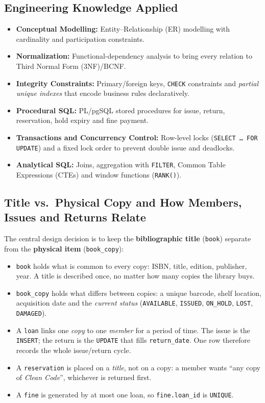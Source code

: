 \documentclass[11pt,a4paper]{report}
\begin{document}
\subsection{Engineering Knowledge Applied}
\begin{itemize}
    \item \textbf{Conceptual Modelling:} Entity--Relationship (ER) modelling with cardinality and participation constraints.
    \item \textbf{Normalization:} Functional-dependency analysis to bring every relation to Third Normal Form (3NF)/BCNF.
    \item \textbf{Integrity Constraints:} Primary/foreign keys, \texttt{CHECK} constraints and \emph{partial unique indexes} that encode business rules declaratively.
    \item \textbf{Procedural SQL:} PL/pgSQL stored procedures for issue, return, reservation, hold expiry and fine payment.
    \item \textbf{Transactions and Concurrency Control:} Row-level locks (\texttt{SELECT \dots\ FOR UPDATE}) and a fixed lock order to prevent double issue and deadlocks.
    \item \textbf{Analytical SQL:} Joins, aggregation with \texttt{FILTER}, Common Table Expressions (CTEs) and window functions (\texttt{RANK()}).
\end{itemize}

\subsection{Title vs.\ Physical Copy and How Members, Issues and Returns Relate}
\label{sec:er}
The central design decision is to keep the \textbf{bibliographic title} (\texttt{book}) separate from the \textbf{physical item} (\texttt{book\_copy}):
\begin{itemize}
    \item \texttt{book} holds what is common to every copy: ISBN, title, edition, publisher, year. A title is described once, no matter how many copies the library buys.
    \item \texttt{book\_copy} holds what differs between copies: a unique barcode, shelf location, acquisition date and the \emph{current status} (\texttt{AVAILABLE}, \texttt{ISSUED}, \texttt{ON\_HOLD}, \texttt{LOST}, \texttt{DAMAGED}).
    \item A \texttt{loan} links one \emph{copy} to one \emph{member} for a period of time. The issue is the \texttt{INSERT}; the return is the \texttt{UPDATE} that fills \texttt{return\_date}. One row therefore records the whole issue/return cycle.
    \item A \texttt{reservation} is placed on a \emph{title}, not on a copy: a member wants ``any copy of \textit{Clean Code}'', whichever is returned first.
    \item A \texttt{fine} is generated by at most one loan, so \texttt{fine.loan\_id} is \texttt{UNIQUE}.
\end{itemize}
\end{document}
